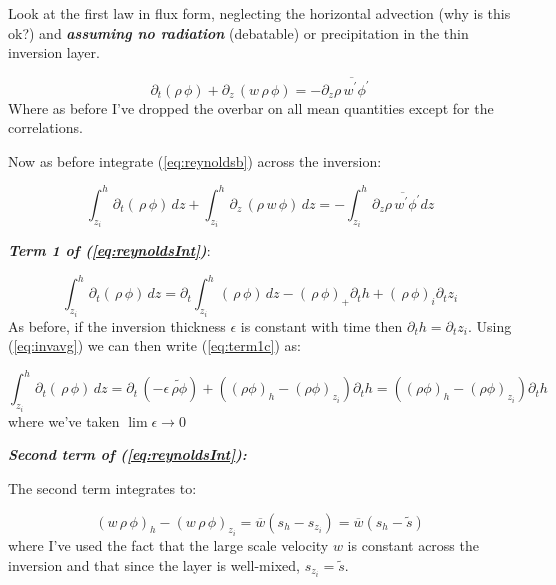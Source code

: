 \documentclass[12pt]{article}
\begin{document}
Look at the first law in flux form, neglecting the horizontal advection (why is this ok?) and
\textbf{\textit{assuming no radiation}} (debatable) or precipitation in the thin inversion layer.

\begin{equation}
  \label{eq:reynoldsb}
  \partial_t (\rho\,\phi) + \partial_z \, (w \,\rho\,\phi) =
- \partial_z \overline{\rho\, w^\prime \phi^\prime} 
\end{equation}
Where  as before I've dropped the overbar on all mean quantities except for the 
correlations.  


Now as before integrate (\ref{eq:reynoldsb}) across the inversion:

\begin{equation}
  \label{eq:reynoldsInt}
\int_{z_i}^{h} \! 
  \partial_t (\,\rho\,\phi )\, dz  + 
 \int_{z_i}^{h} \! \partial_z \, (\rho\,w \,\phi) \, dz  =
 - \int_{z_i}^{h} \partial_z \overline{\rho\, w^\prime \phi^\prime} dz
\end{equation}


\noindent
\textit{\textbf{Term 1 of (\ref{eq:reynoldsInt})}}:

\begin{equation}
  \label{eq:term1c}
\int_{z_i}^{h} \! 
  \partial_t (\,\rho\,\phi )\, dz = \partial_t \int_{z_i}^{h} \! 
   (\,\rho\,\phi )\, dz - (\,\rho\,\phi )_+ \partial_t h  +  (\,\rho\,\phi )_i \partial_t z_i
\end{equation}
As before, if the inversion thickness $\epsilon$ is constant with time then $\partial_t h = \partial_t z_i$.
Using (\ref{eq:invavg}) we can then write (\ref{eq:term1c}) as:

\begin{equation}
  \label{eq:term1d}
\int_{z_i}^{h} \! 
  \partial_t (\,\rho\,\phi )\, dz = \partial_t \,\left (- \epsilon \,\widetilde{\rho \phi} \right )
     + ((\rho \phi)_h - (\rho \phi)_{z_i}) \partial_t h = ((\rho \phi)_h - (\rho \phi)_{z_i}) \partial_t h
\end{equation}
where we've taken $\lim{{\epsilon \rightarrow 0}}$



\noindent
\textbf{\textit{Second term of (\ref{eq:reynoldsInt}):}}

The second term integrates to:

\begin{equation}
  \label{eq:secondd}
(w\,\rho\,\phi)_h - (w\,\rho\,\phi)_{z_i} = \overline{w} (s_h - s_{z_i}) = \overline{w} (s_h - \widetilde{s})
\end{equation}
where I've used the fact that the large scale velocity $w$ is constant across the inversion and
that since the layer is well-mixed, $s_{z_i} = \widetilde{s}$.
\end{document}
